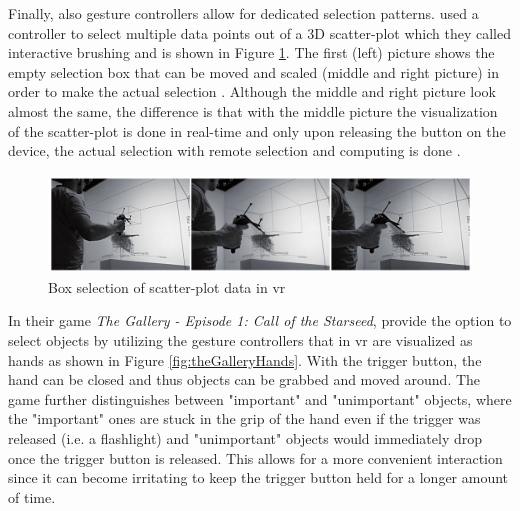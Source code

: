 Finally, also gesture controllers allow for dedicated selection patterns. \cite{Hentschel2009} used a controller to select multiple data points out of a 3D scatter-plot which they called interactive brushing and is shown in Figure \ref{fig:interactivebrushing}. The first (left) picture shows the empty selection box that can be moved and scaled (middle and right picture) in order to make the actual selection \citep{Hentschel2009}. Although the middle and right picture look almost the same, the difference is that with the middle picture the visualization of the scatter-plot is done in real-time and only upon releasing the button on the device, the actual selection with remote selection and computing is done \citep{Hentschel2009}.
\begin{figure}[h]
	\begin{center}
		\includegraphics[width=14cm]{03_Figures/05_LitReview/Hentschel2009_InteractiveBrushing.png}
		\caption[Box selection of scatter-plot data in \gls{vr}]{Box selection of scatter-plot data in \gls{vr} \citep{Hentschel2009}}
		\label{fig:interactivebrushing}
	\end{center}
\end{figure} \newline
In their game \textit{The Gallery - Episode 1: Call of the Starseed}, \cite{CloudheadGames2016} provide the option to select objects by utilizing the gesture controllers that in \gls{vr} are visualized as hands as shown in Figure \ref{fig:theGalleryHands}. With the trigger button, the hand can be closed and thus objects can be grabbed and moved around. The game further distinguishes between "important" and "unimportant" objects, where the "important" ones are stuck in the grip of the hand even if the trigger was released (i.e. a flashlight) and "unimportant" objects would immediately drop once the trigger button is released. This allows for a more convenient interaction since it can become irritating to keep the trigger button held for a longer amount of time. \newline
